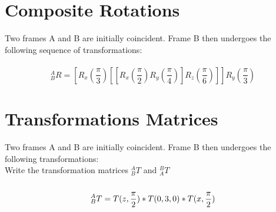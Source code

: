 \documentclass[12pt,letterpaper]{article}
\begin{document}
\section{Composite Rotations}
Two frames A and B are initially coincident. Frame B then undergoes the following sequence of
transformations:
\\
\\
$$
    ^{A}_{B}R = [R_{x}(\frac{\pi}{3})[[R_{x}(\frac{\pi}{2})R_{y}(\frac{\pi}{4})]R_{z}(\frac{\pi}{6})]]R_{y}(\frac{\pi}{3})
$$
\section{Transformations Matrices}
Two frames A and B are initially coincident. Frame B then undergoes the following transformations:
\\
Write the transformation matrices $_{B}^{A}T$ and $_{A}^{B}T$
\\
\\
$$
    _{B}^{A}T = T(z, \frac{\pi}{2}) * T(0, 3, 0) * T(x, \frac{\pi}{2})
    \\
$$
\end{document}
